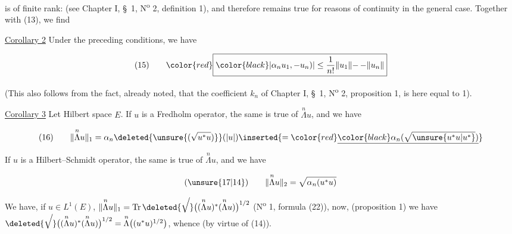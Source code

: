 is of finite rank:  (see Chapter I, \S~1, N\textsuperscript{o} 2, definition 1), and therefore remains true for reasons of continuity in the general case. Together with (13), we find

{\reversemarginpar{}}
\uline{Corollary 2} Under the preceding conditions, we have

\[
\begin{array}{@{}l@{\qquad}l@{}}
(15) & {\color{red}\boxed{{\color{black}\displaystyle |\alpha_n u_1,\mathord{-}u_n)|\leq\frac1{n!}\lVert u_1\rVert\mathord{-}\,\mathord{-}\lVert u_n\rVert}}}
\end{array}
\]

(This also follows from the fact, already noted, that the coefficient $k_n$ of Chapter I, \S~1, N\textsuperscript{o} 2, proposition 1, is here equal to 1).

{\reversemarginpar{}}
\uline{Corollary 3} Let   Hilbert space $E$.  If $u$ is a Fredholm operator, the same is true of $\overset{n}{\Lambda}u$, and we have

\[
\begin{array}{@{}l@{\qquad}l@{}}
(16) & \displaystyle \lVert\overset{n}{\Lambda}u\rVert_1=\alpha_n\deleted{\unsure{(\sqrt{u^*u})}}(|u|)\inserted{={\color{red}\underline{{\color{black}\alpha_n(\sqrt{\unsure{u^*u|u^*}})}}}}
\end{array}
\]

If $u$ is a Hilbert--Schmidt operator, the same is true of $\overset{n}{\Lambda}u$, and we have

\[
\begin{array}{@{}l@{\qquad}l@{}}
(\unsure{17|14}) & \displaystyle \lVert\overset{n}{\Lambda}u\rVert_2=\sqrt{\alpha_n(u^*u)}
\end{array}
\]

We have, if $u\in L^1(E)$, $\lVert\overset{n}{\Lambda}u\rVert_1=\operatorname{Tr}\deleted{\sqrt{\vphantom{(\overset{n}{\Lambda}u)^*}}}\bigl((\overset{n}{\Lambda}u)^*(\overset{n}{\Lambda}u)\bigr)^{1/2}$ (N\textsuperscript{o} 1, formula (22)), now, (proposition 1) we have $\deleted{\sqrt{\vphantom{(\overset{n}{\Lambda}u)^*}}}\bigl((\overset{n}{\Lambda}u)^*(\overset{n}{\Lambda}u)\bigr)^{1/2}=\overset{n}{\Lambda}\bigl((u^*u)^{1/2}\bigr)$, whence   (by virtue of (14)).

